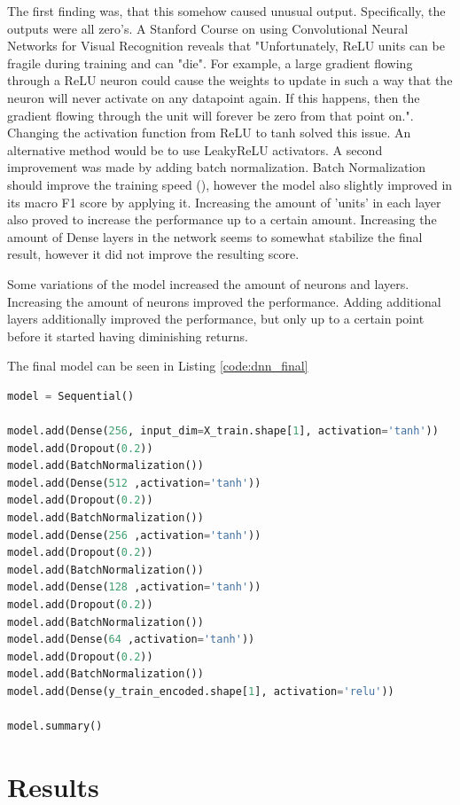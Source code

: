 \documentclass[preprint,12pt]{elsarticle}
\begin{document}
The first finding was, that this somehow caused unusual output. Specifically, the outputs were all zero's. A Stanford Course on using Convolutional Neural Networks for Visual Recognition reveals that "Unfortunately, ReLU units can be fragile during training and can "die". For example, a large gradient flowing through a ReLU neuron could cause the weights to update in such a way that the neuron will never activate on any datapoint again. If this happens, then the gradient flowing through the unit will forever be zero from that point on."\cite{CSN:ReLU}. Changing the activation function from ReLU to tanh solved this issue. An alternative method would be to use LeakyReLU activators.
A second improvement was made by adding batch normalization. Batch Normalization should improve the training speed (\citet{Ioffe:2015}), however the model also slightly improved in its macro F1 score by applying it. Increasing the amount of 'units' in each layer also proved to increase the performance up to a certain amount. Increasing the amount of Dense layers in the network seems to somewhat stabilize the final result, however it did not improve the resulting score.

Some variations of the model increased the amount of neurons and layers. Increasing the amount of neurons improved the performance. Adding additional layers additionally improved the performance, but only up to a certain point before it started having diminishing returns.

The final model can be seen in Listing \ref{code:dnn_final}

\begin{lstlisting}[language=Python, label={code:dnn_final},caption={Final Deep Neural Network}]
model = Sequential()

model.add(Dense(256, input_dim=X_train.shape[1], activation='tanh'))
model.add(Dropout(0.2))
model.add(BatchNormalization())
model.add(Dense(512 ,activation='tanh'))
model.add(Dropout(0.2))
model.add(BatchNormalization())
model.add(Dense(256 ,activation='tanh'))
model.add(Dropout(0.2))
model.add(BatchNormalization())
model.add(Dense(128 ,activation='tanh'))
model.add(Dropout(0.2))
model.add(BatchNormalization())
model.add(Dense(64 ,activation='tanh'))
model.add(Dropout(0.2))
model.add(BatchNormalization())
model.add(Dense(y_train_encoded.shape[1], activation='relu'))

model.summary()
\end{lstlisting}

\section{Results}
\label{S:4}
\end{document}
